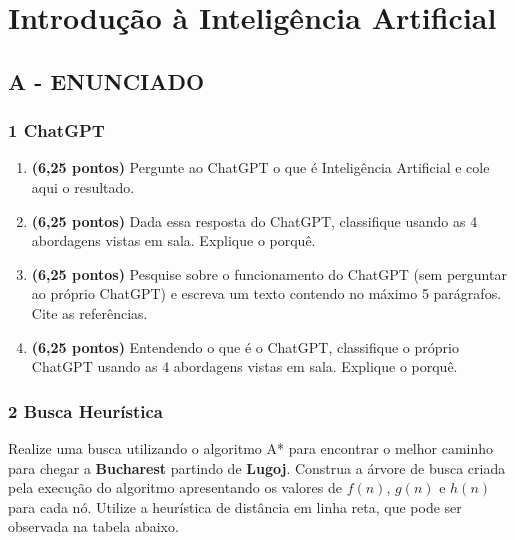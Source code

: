 \label{ap:ap01}
\chapter{Introdução à Inteligência Artificial}

\section*{\textbf{A - ENUNCIADO}}


\subsection*{\textbf{1 ChatGPT}}
    \begin{enumerate}[label=\alph*)]
        \item \textbf{(6,25 pontos)} Pergunte ao ChatGPT o que é Inteligência Artificial e cole aqui o resultado.
        \item \textbf{(6,25 pontos)} Dada essa resposta do ChatGPT, classifique usando as 4 abordagens vistas em sala. Explique o porquê.
        \item \textbf{(6,25 pontos)} Pesquise sobre o funcionamento do ChatGPT (sem perguntar ao próprio ChatGPT) e escreva um texto contendo no máximo 5 parágrafos. Cite as referências.
        \item \textbf{(6,25 pontos)} Entendendo o que é o ChatGPT, classifique o próprio ChatGPT usando as 4 abordagens vistas em sala. Explique o porquê.
    \end{enumerate}

\subsection*{\textbf{2 Busca Heurística}}
    Realize uma busca utilizando o algoritmo A* para encontrar o melhor caminho para chegar a \textbf{Bucharest} partindo de \textbf{Lugoj}. Construa a árvore de busca criada pela execução do algoritmo apresentando os valores de $f(n)$, $g(n)$ e $h(n)$ para cada nó. Utilize a heurística de distância em linha reta, que pode ser observada na tabela abaixo.

